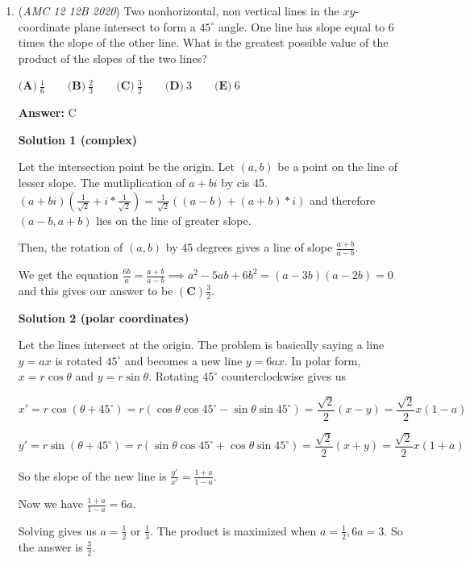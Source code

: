 \begin{enumerate}
	\item (\textit{AMC 12 12B 2020}) Two nonhorizontal, non vertical lines in the $xy$-coordinate plane intersect to form a $45^{\circ}$ angle. One line has slope equal to $6$ times the slope of the other line. What is the greatest possible value of the product of the slopes of the two lines?


 $\textbf{(A)}\ \frac16 \qquad\textbf{(B)}\ \frac23 \qquad\textbf{(C)}\  \frac32 \qquad\textbf{(D)}\ 3 \qquad\textbf{(E)}\ 6$

 \textbf{Answer: }C



\textbf{Solution 1 (complex)}

Let the intersection point be the origin. Let $(a,b)$ be a point on the line of lesser slope. The mutliplication of $a+bi$ by cis 45.$(a+bi)(\frac{1}{\sqrt 2 }+i*\frac{1}{\sqrt 2 })=\frac{1}{\sqrt 2 }((a-b)+(a+b)*i)$ and therefore $(a-b, a+b)$ lies on the line of greater slope.

 Then, the rotation of $(a,b)$ by 45 degrees gives a line of slope $\frac{a+b}{a-b}$.

 We get the equation $\frac{6b}{a}=\frac{a+b}{a-b}\implies a^2-5ab+6b^2=(a-3b)(a-2b)=0$ and this gives our answer to be $\mathbf{(C)} \frac{3}{2}$.

 



\textbf{Solution 2 (polar coordinates)}

Let the lines intersect at the origin. The problem is basically saying a line $y = ax$ is rotated $45^\circ$ and becomes a new line $y = 6ax.$ In polar form, $x = r\cos\theta$ and $y = r\sin\theta$. Rotating $45^\circ$ counterclockwise gives us 

 
 \[x' = r\cos(\theta + 45^\circ) = r(\cos\theta \cos 45^\circ - \sin\theta \sin 45^\circ) = \frac{\sqrt{2}}{2}(x-y) = \frac{\sqrt{2}}{2}x(1-a)\]

 \[y' = r\sin(\theta + 45^\circ) = r(\sin\theta \cos 45^\circ + \cos\theta \sin 45^\circ) = \frac{\sqrt{2}}{2}(x+y) = \frac{\sqrt{2}}{2}x(1+a)\]

 So the slope of the new line is $\frac{y'}{x'} = \frac{1 + a}{1 - a}.$ 

 Now we have $\frac{1 + a}{1 - a} = 6a.$

 Solving gives us $a = \frac{1}{2}$ or $\frac{1}{3}.$ The product is maximized when $a = \frac{1}{2}, 6a = 3.$ So the answer is $\boxed{\frac{3}{2}}.$





\end{enumerate}
